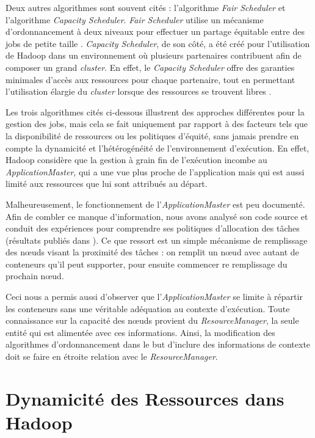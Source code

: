 Deux autres algorithmes sont souvent cités : l'algorithme \textit{Fair Scheduler} et l'algorithme \textit{Capacity Scheduler}. \textit{Fair Scheduler} utilise un mécanisme d'ordonnancement à deux niveaux pour effectuer un partage équitable entre des jobs de petite taille \cite{Hadoop}. \textit{Capacity Scheduler}, de son côté, a été créé pour l'utilisation de Hadoop dans un environnement où plusieurs partenaires contribuent afin de composer un grand \textit{cluster}. En effet, le \textit{Capacity Scheduler} offre des garanties minimales d'accès aux ressources pour chaque partenaire, tout en permettant l'utilisation élargie du \textit{cluster} lorsque des ressources se trouvent libres \cite{Hadoop}.

Les trois algorithmes cités ci-dessous illustrent des approches différentes pour la gestion des jobs, mais cela se fait uniquement par rapport à des facteurs tels que la disponibilité de ressources ou les politiques d'équité, sans jamais prendre en compte la dynamicité et l'hétérogénéité de l'environnement d'exécution. En effet, Hadoop considère que la gestion à grain fin de l'exécution incombe au  \textit{ApplicationMaster}, qui a une vue plus proche de l'application mais qui est aussi limité aux ressources que lui sont attribués au départ.

Malheureusement, le fonctionnement de l'\textit{ApplicationMaster} est peu documenté. Afin de combler ce manque d'information, nous avons analysé son code source et conduit des expériences pour comprendre ses politiques d'allocation des tâches (résultats publiés dans \cite{UBICOMM2014}). Ce que ressort est un simple mécanisme de remplissage des n{\oe}uds visant la proximité des tâches : on remplit un n{\oe}ud avec autant de conteneurs qu'il peut supporter, pour ensuite commencer re remplissage du prochain n{\oe}ud.   

Ceci nous a permis aussi d'observer que l'\textit{ApplicationMaster} se limite à répartir les conteneurs sans une véritable adéquation au contexte d'exécution. Toute connaissance sur la capacité des n{\oe}uds provient du \textit{ResourceManager}, la seule entité qui est alimentée avec ces informations. Ainsi, la modification des algorithmes d'ordonnancement dans le but d'inclure des informations de contexte doit se faire en étroite relation avec le \textit{ResourceManager}.



\section{Dynamicité des Ressources dans Hadoop} \label{sec:related}


